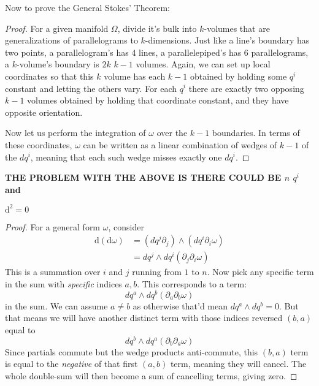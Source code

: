 	Now to prove the General Stokes' Theorem:
	\begin{proof}
		For a given manifold $\Omega$, divide it's bulk into $k$-volumes that are generalizations of parallelograms to $k$-dimensions. Just like a line's boundary has two points, a parallelogram's has 4 lines, a parallelepiped's has $6$ parallelograms, a $k$-volume's boundary is $2k$ $k-1$ volumes. Again, we can set up local coordinates so that this $k$ volume has each $k-1$ obtained by holding some $q^i$ constant and letting the others vary. For each $q^i$ there are exactly two opposing $k-1$ volumes obtained by holding that coordinate constant, and they have opposite orientation.
		
		Now let us perform the integration of $\omega$ over the $k-1$ boundaries. In terms of these coordinates, $\omega$ can be written as a linear combination of wedges of $k-1$ of the $dq^i$, meaning that each such wedge misses exactly one $dq^i$.
	\end{proof}
	\textbf{THE PROBLEM WITH THE ABOVE IS THERE COULD BE $n$ $q^i$ and }
	\begin{prop}
		$\mathrm d^2 = 0$
	\end{prop}
	\begin{proof}
		For a general form $\omega$, consider
		\begin{align*}
			\mathrm d (\mathrm d\omega) &= (dq^j \partial_j)\wedge (dq^i \partial_i \omega) \\
					& = dq^j \wedge dq^i (\partial_j \partial_i \omega)
		\end{align*}
		This is a summation over $i$ and $j$ running from $1$ to $n$. Now pick any specific term in the sum with \emph{specific} indices $a, b$. This corresponds to a term:
		\begin{equation*}
			dq^a \wedge dq^b (\partial_{a} \partial_{b} \omega)
		\end{equation*}
		in the sum. We can assume $a \neq b$ as otherwise that'd mean $dq^a \wedge dq^b = 0$.
		But that means we will have another distinct term with those indices reversed $(b,a)$ equal to
		\begin{equation*}
			dq^b \wedge dq^a (\partial_{b} \partial_{a} \omega)
		\end{equation*}
		Since partials commute but the wedge products anti-commute, this $(b,a)$ term is equal to the \emph{negative} of that first $(a,b)$ term, meaning they will cancel. The whole double-sum will then become a sum of cancelling terms, giving zero.
	\end{proof}
